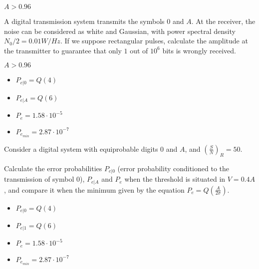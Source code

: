 \documentclass[es,boletin]{uah}
\begin{document}
{

$A > 0.96$

}
{

	A digital transmission system transmits the symbols $0$ and $A$. At the receiver, the noise can be considered as white and Gaussian, with power spectral density $N_0/2 = 0.01 W/Hz$. If we suppose rectangular pulses, calculate the amplitude at the transmitter to guarantee that only $1$ out of $10^6$ bits is wrongly received.
	
}
{

$A > 0.96$

}

{

\begin{itemize}
	\item $P_{e|0} = Q(4)$
	\item $P_{e|A} = Q(6)$
	\item $P_e = 1.58 \cdot 10^{-5}$
	\item $P_{e_{min}} = 2.87 \cdot 10^{-7}$
\end{itemize}
}
{

	Consider a digital system with equiprobable digits $0$ and $A$, and $\left ( \frac{S}{N} \right )_R=50$. 
	
	
	Calculate the error probabilities $P_{e|0}$ (error probability conditioned to the transmission of symbol 0), $P_{e|A}$ and $P_e$ when the threshold is situated in $V=0.4 A$, and compare it when the minimum given by the equation $P_e=Q\left ( \frac{A}{2\sigma} \right )$.
}
{

\begin{itemize}
	\item $P_{e|0} = Q(4)$
	\item $P_{e|1} = Q(6)$
	\item $P_e = 1.58 \cdot 10^{-5}$
	\item $P_{e_{min}} = 2.87 \cdot 10^{-7}$
\end{itemize}
}
\end{document}

